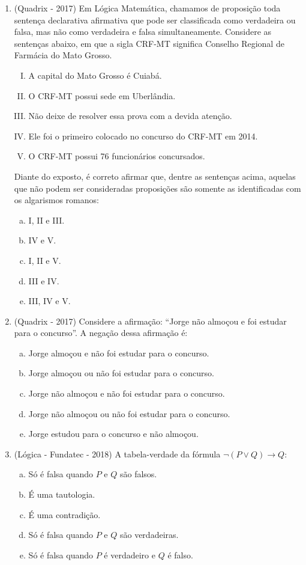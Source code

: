 \begin{enumerate}
\item (Quadrix - 2017) Em Lógica Matemática, chamamos de proposição toda sentença declarativa afirmativa que pode ser classificada como verdadeira ou falsa, mas não como verdadeira e falsa simultaneamente. Considere as sentenças abaixo, em que a sigla CRF-MT significa Conselho Regional de Farmácia do Mato Grosso.
\begin{enumerate}[I.]
\item A capital do Mato Grosso é Cuiabá.
\item O CRF-MT possui sede em Uberlândia.
\item Não deixe de resolver essa prova com a devida atenção.
\item Ele foi o primeiro colocado no concurso do CRF-MT em 2014.
\item O CRF-MT possui 76 funcionários concursados.
\end{enumerate}
Diante do exposto, é correto afirmar que, dentre as sentenças acima, aquelas que não podem ser consideradas proposições são somente as identificadas com os algarismos romanos:
\begin{multicols}{2}
\begin{enumerate}[a)]
\item I, II e III.
\item IV e V.
\item I, II e V.
\item III e IV.
\item III, IV e V.
\end{enumerate}
\end{multicols}

\item (Quadrix - 2017) Considere a afirmação: “Jorge não almoçou e foi estudar para o concurso”. A negação dessa afirmação é:
\begin{enumerate}[a)]
\item Jorge almoçou e não foi estudar para o concurso.
\item Jorge almoçou ou não foi estudar para o concurso.
\item Jorge não almoçou e não foi estudar para o concurso.
\item Jorge não almoçou ou não foi estudar para o concurso.
\item Jorge estudou para o concurso e não almoçou.
\end{enumerate}

\item (Lógica - Fundatec - 2018) A tabela-verdade da fórmula $\neg(P \lor Q) \rightarrow Q$:
\begin{enumerate}[a)]
\item Só é falsa quando $P$ e $Q$ são falsos.
\item É uma tautologia.
\item É uma contradição.
\item Só é falsa quando $P$ e $Q$ são verdadeiras.
\item Só é falsa quando $P$ é verdadeiro e $Q$ é falso.
\end{enumerate}


\end{enumerate}
